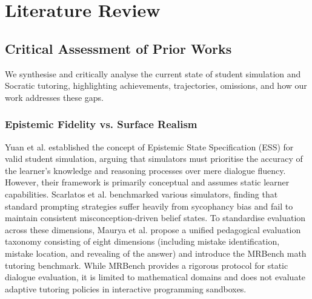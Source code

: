 \chapter{Literature Review}
\label{ch:litreview}

\section{Critical Assessment of Prior Works}
We synthesise and critically analyse the current state of student simulation and Socratic tutoring, highlighting achievements, trajectories, omissions, and how our work addresses these gaps.

\subsection{Epistemic Fidelity vs. Surface Realism}
Yuan et al. \cite{yuan2026towards} established the concept of Epistemic State Specification (ESS) for valid student simulation, arguing that simulators must prioritise the accuracy of the learner's knowledge and reasoning processes over mere dialogue fluency. However, their framework is primarily conceptual and assumes static learner capabilities. Scarlatos et al. \cite{scarlatos2026simulated} benchmarked various simulators, finding that standard prompting strategies suffer heavily from sycophancy bias and fail to maintain consistent misconception-driven belief states. To standardise evaluation across these dimensions, Maurya et al. \cite{maurya2025unifying} propose a unified pedagogical evaluation taxonomy consisting of eight dimensions (including mistake identification, mistake location, and revealing of the answer) and introduce the MRBench math tutoring benchmark. While MRBench provides a rigorous protocol for static dialogue evaluation, it is limited to mathematical domains and does not evaluate adaptive tutoring policies in interactive programming sandboxes.

